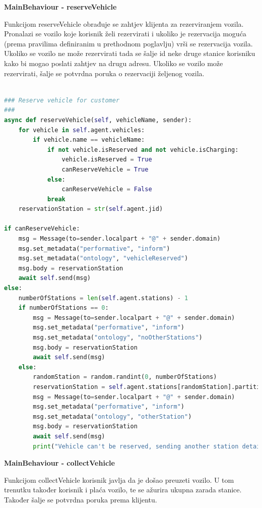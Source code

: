 \documentclass{foi}
\begin{document}
\begin{flushleft}\textbf{MainBehaviour - reserveVehicle}\end{flushleft}

Funkcijom reserveVehicle obrađuje se zahtjev klijenta za rezerviranjem vozila. Pronalazi se vozilo koje korisnik želi rezervirati i ukoliko je rezervacija moguća (prema pravilima definiranim u prethodnom poglavlju) vrši se rezervacija vozila. Ukoliko se vozilo ne može rezervirati tada se šalje id neke druge stanice korisniku kako bi mogao poslati zahtjev na drugu adresu. Ukoliko se vozilo može rezervirati, šalje se potvrdna poruka o rezervaciji željenog vozila.

\begin{lstlisting}[language=Python]

### Reserve vehicle for customer
###
async def reserveVehicle(self, vehicleName, sender):
	for vehicle in self.agent.vehicles:
		if vehicle.name == vehicleName:
			if not vehicle.isReserved and not vehicle.isCharging:
				vehicle.isReserved = True
				canReserveVehicle = True
			else:
				canReserveVehicle = False
			break
	reservationStation = str(self.agent.jid)

if canReserveVehicle:
	msg = Message(to=sender.localpart + "@" + sender.domain)
	msg.set_metadata("performative", "inform")
	msg.set_metadata("ontology", "vehicleReserved")
	msg.body = reservationStation
	await self.send(msg)
else:
	numberOfStations = len(self.agent.stations) - 1
	if numberOfStations == 0:
		msg = Message(to=sender.localpart + "@" + sender.domain)
		msg.set_metadata("performative", "inform")
		msg.set_metadata("ontology", "noOtherStations")
		msg.body = reservationStation
		await self.send(msg) 
	else:
		randomStation = random.randint(0, numberOfStations)
		reservationStation = self.agent.stations[randomStation].partition("@")[0]
		msg = Message(to=sender.localpart + "@" + sender.domain)
		msg.set_metadata("performative", "inform")
		msg.set_metadata("ontology", "otherStation")
		msg.body = reservationStation
		await self.send(msg) 
		print("Vehicle can't be reserved, sending another station details to customer...")

\end{lstlisting}

\begin{flushleft}\textbf{MainBehaviour - collectVehicle}\end{flushleft}

Funkcijom collectVehicle korisnik javlja da je došao preuzeti vozilo. U tom trenutku također korisnik i plaća vozilo, te se ažurira ukupna zarada stanice. Također šalje se potvrdna poruka prema klijentu.
\end{document}
